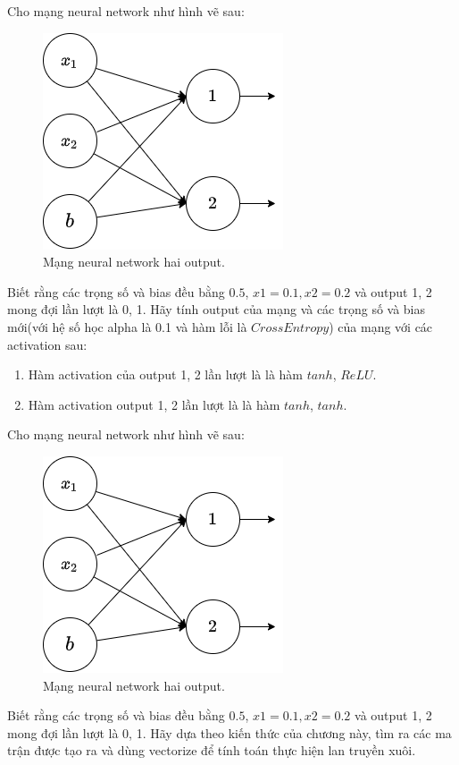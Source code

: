 \clearpage
\begin{exer}
Cho mạng neural network như hình vẽ sau:
\begin{figure}[!h]
	\centering
		\includegraphics[width=0.5\columnwidth]{chapter03/figure/bai2.png}
        \caption{Mạng neural network hai output.}
        \label{sec3:bai2}
		\centering
\end{figure}

Biết rằng các trọng số và bias đều bằng $0.5$, $x1=0.1, x2=0.2$ và output 1, 2 mong đợi lần lượt là 0, 1. Hãy tính output của mạng và các trọng số và bias mới(với hệ số học alpha là 0.1 và hàm lỗi là $CrossEntropy$) của mạng với các activation sau:
\begin{enumerate}
    \item Hàm activation của output 1, 2 lần lượt là là hàm $tanh$, $ReLU$.
    \item Hàm activation output 1, 2 lần lượt là là hàm $tanh$, $tanh$.
\end{enumerate}
\end{exer}

\clearpage
\begin{exer}
Cho mạng neural network như hình vẽ sau:
\begin{figure}[!h]
	\centering
		\includegraphics[width=0.5\columnwidth]{chapter03/figure/bai2.png}
        \caption{Mạng neural network hai output.}
		\centering
\end{figure}

Biết rằng các trọng số và bias đều bằng $0.5$, $x1=0.1, x2=0.2$ và output 1, 2 mong đợi lần lượt là 0, 1. Hãy dựa theo kiến thức của chương này, tìm ra các ma trận được tạo ra và dùng vectorize để tính toán thực hiện lan truyền xuôi.
\end{exer}